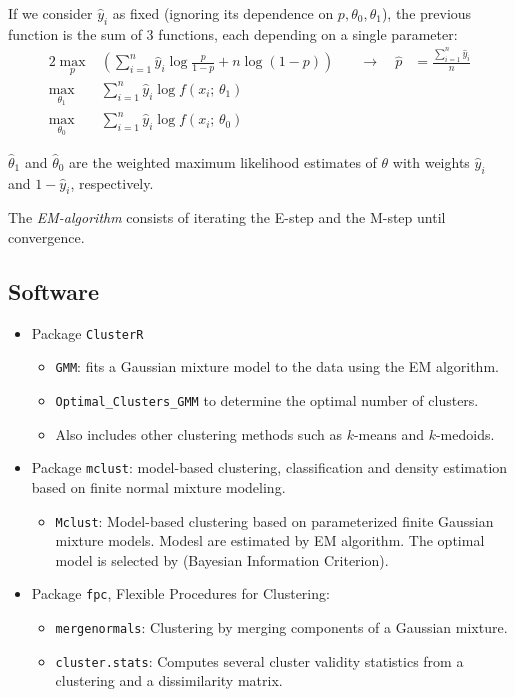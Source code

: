 If we consider $\hat{y}_i$ as fixed (ignoring its dependence on $p, \theta_0, \theta_1$), the
previous function is the sum of 3 functions, each depending on a single parameter:
\begin{alignat*}{2}
    \max_{p}&\left( \sum_{i=1}^n \hat{y}_i \log \frac{p}{1-p} + n \log (1 - p) \right) & \quad \rightarrow{} \quad
    \hat{p} & = \frac{\sum_{i=1}^n \hat{y}_i}{n} \\
    \max_{\theta_1}&\sum_{i=1}^n \hat{y}_i \log f(x_i;\,\theta_1) \\
    \max_{\theta_0}&\sum_{i=1}^n \hat{y}_i \log f(x_i;\,\theta_0)
\end{alignat*}

$\hat{\theta}_1$ and $\hat{\theta}_0$ are the weighted maximum likelihood estimates
of $\theta$ with weights $\hat{y}_i$ and $1 - \hat{y}_i$, respectively.

\begin{marker}
    The \emph{EM-algorithm} consists of iterating the E-step and the M-step until convergence.
\end{marker}

\subsection{Software}
\begin{itemize}
	\item Package \texttt{ClusterR}
	      \begin{itemize}
		      \item \texttt{GMM}: fits a Gaussian mixture model to the data using the EM algorithm.
		      \item \texttt{Optimal\_Clusters\_GMM} to determine the optimal number of clusters.
		      \item Also includes other clustering methods such as $k$-means and $k$-medoids.
	      \end{itemize}
	\item Package \texttt{mclust}: model-based clustering, classification and density estimation
        based on finite normal mixture modeling.
	      \begin{itemize}
		      \item \texttt{Mclust}: Model-based clustering based on parameterized finite
                  Gaussian mixture models. Modesl are estimated by EM algorithm. The optimal
                  model is selected by  (Bayesian Information Criterion).
	      \end{itemize}
	\item Package \texttt{fpc}, Flexible Procedures for Clustering:
	      \begin{itemize}
		      \item \texttt{mergenormals}: Clustering by merging components of a Gaussian mixture.
		      \item \texttt{cluster.stats}: Computes several cluster validity statistics from a
		            clustering and a dissimilarity matrix.
	      \end{itemize}
\end{itemize}

